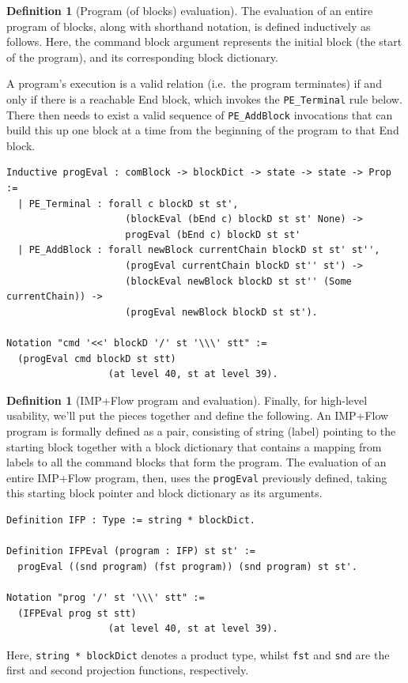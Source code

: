 \documentclass[12pt,notitlepage]{report}
\theoremstyle{plain}
\theoremstyle{definition}
\newtheorem{defin}[theo]{Definition}
\numberwithin{equation}{section}
\begin{document}
\begin{defin}[Program (of blocks) evaluation]
The evaluation of an entire program of blocks, along with shorthand notation, is defined inductively as follows.  Here, the command block argument represents the initial block (the start of the program), and its corresponding block dictionary.  
\par A program's execution is a valid relation (i.e.\ the program terminates) if and only if there is a reachable End block, which invokes the \verb$PE_Terminal$ rule below. There then needs to exist a valid sequence of \verb$PE_AddBlock$ invocations that can build this up one block at a time from the beginning of the program to that End block.
\begin{verbatim}
Inductive progEval : comBlock -> blockDict -> state -> state -> Prop :=
  | PE_Terminal : forall c blockD st st',
                     (blockEval (bEnd c) blockD st st' None) ->
                     progEval (bEnd c) blockD st st'
  | PE_AddBlock : forall newBlock currentChain blockD st st' st'',
                     (progEval currentChain blockD st'' st') ->
                     (blockEval newBlock blockD st st'' (Some currentChain)) ->
                     (progEval newBlock blockD st st').

Notation "cmd '<<' blockD '/' st '\\\' stt" :=
  (progEval cmd blockD st stt)
                  (at level 40, st at level 39).
\end{verbatim}
\end{defin}

\begin{defin}[IMP+Flow program and evaluation]
Finally, for high-level usability, we'll put the pieces together and define the following.  An IMP+Flow program is formally defined as a pair, consisting of string (label) pointing to the starting block together with a block dictionary that contains a mapping from labels to all the command blocks that form the program.  The evaluation of an entire IMP+Flow program, then, uses the \verb$progEval$ previously defined, taking this starting block pointer and block dictionary as its arguments.
\begin{verbatim}
Definition IFP : Type := string * blockDict.

Definition IFPEval (program : IFP) st st' := 
  progEval ((snd program) (fst program)) (snd program) st st'.

Notation "prog '/' st '\\\' stt" :=
  (IFPEval prog st stt)
                  (at level 40, st at level 39).
\end{verbatim}
Here, \verb$string * blockDict$ denotes a product type, whilst \verb$fst$ and \verb$snd$ are the first and second projection functions, respectively.  
\end{defin}
\end{document}
